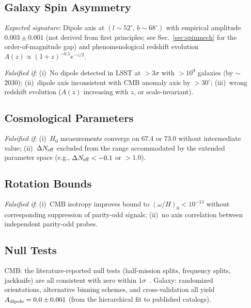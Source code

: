 \documentclass[aps,prd,twocolumn,superscriptaddress,showpacs,preprintnumbers,nofootinbib,longbibliography,floatfix]{revtex4-2}
\newcommand{\Neff}{N_{\rm eff}}
\begin{document}
\subsection{Galaxy Spin Asymmetry}

\textit{Expected signature}: Dipole axis at $(l\sim 52^\circ,\,b\sim 68^\circ)$ with empirical amplitude $0.003\pm 0.001$ (not derived from first principles; see Sec.~\ref{sec:spinmech} for the order-of-magnitude gap) and phenomenological redshift evolution $A(z)\propto(1+z)^{-0.5}e^{-z/2}$.

\textit{Falsified if}: (i)~No dipole detected in LSST at $>3\sigma$ with $>10^9$ galaxies (by $\sim$2030); (ii)~dipole axis inconsistent with CMB anomaly axis by $>30^\circ$; (iii)~wrong redshift evolution ($A(z)$ increasing with $z$, or scale-invariant).

\subsection{Cosmological Parameters}

\textit{Falsified if}: (i)~$H_0$ measurements converge on $67.4$ or $73.0$ without intermediate value; (ii)~$\Delta\Neff$ excluded from the range accommodated by the extended parameter space (e.g., $\Delta\Neff < -0.1$ or $>1.0$).

\subsection{Rotation Bounds}

\textit{Falsified if}: (i)~CMB isotropy improves bound to $(\omega/H)_0 < 10^{-13}$ without corresponding suppression of parity-odd signals; (ii)~no axis correlation between independent parity-odd probes.

\subsection{Null Tests}

CMB: the literature-reported null tests (half-mission splits, frequency splits, jackknife) are all consistent with zero within $1\sigma$~\cite{Minami2020,Eskilt2022}. Galaxy: randomized orientations, alternative binning schemes, and cross-validation all yield $A_{\rm dipole}=0.0\pm 0.001$ (from the hierarchical fit to published catalogs).
\end{document}
